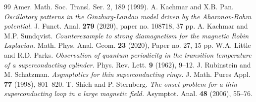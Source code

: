 \documentclass[11pt]{amsart}
\theoremstyle{definition}
\numberwithin{equation}{section}
\begin{document}
\begin{thebibliography}{99}
Amer. Math. Soc. Transl. Ser. 2, 189 (1999).
%
 A. Kachmar and X.B. Pan.
{\it Oscillatory patterns in the Ginzburg-Landau model driven by the Aharonov-Bohm potential.}
J. Funct. Anal. {\bf 279} (2020), paper no. 108718, 37 pp.
%
 A. Kachmar and  M.P. Sundqvist.
{\it Counterexample to strong diamagnetism for the magnetic Robin Laplacian.}
Math. Phys. Anal. Geom. {\bf 23} (2020),  Paper no. 27, 15 pp.
%
 W.A. Little and R.D. Parks. {\it Observation of quantum periodicity in the transition temperature of a superconducting cylinder.} Phys. Rev. Lett. {\bf 9} (1962), 9--12.
%
 J. Rubinstein and M. Schatzman. {\it Asymptotics for thin superconducting rings.} J. Math. Pures Appl. {\bf 77} (1998), 801--820.
%
 T. Shieh and P. Sternberg. {\it The onset problem for a thin superconducting loop in a large magnetic field.} Asymptot. Anal. {\bf 48} (2006), 55--76.
%
\end{thebibliography}

%
%
%
%
%
%
%
%
%
%
%
%
%
%
%
\end{document}
